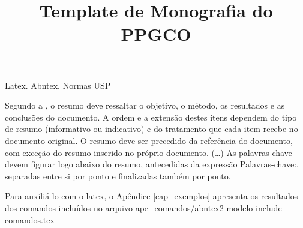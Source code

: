 \documentclass[tesedr]{ppgco}
\title{Template de Monografia do PPGCO}
\begin{document}
\renewcommand{\orientadorname}{Orientador: }
\renewcommand{\coorientadorname}{Coorientador: }
\renewcommand{\agradecimentosname}{Agradecimentos}

\pretextual

\maketitle






\begin{resumo}{Latex. Abntex. Normas USP}

 	 Segundo a , o resumo deve ressaltar o  objetivo, o método, os resultados e as conclusões do documento. A ordem e a extensão  destes itens dependem do tipo de resumo (informativo ou indicativo) e do  tratamento que cada item recebe no documento original. O resumo deve ser  precedido da referência do documento, com exceção do resumo inserido no  próprio documento. (\ldots) As palavras-chave devem figurar logo abaixo do  resumo, antecedidas da expressão Palavras-chave:, separadas entre si por  ponto e finalizadas também por ponto.
     
    Para auxiliá-lo com o latex, o Apêndice 
  \ref{cap_exemplos} apresenta os resultados dos comandos incluídos no arquivo ape\_comandos/abntex2-modelo-include-comandos.tex 

\end{resumo}
\end{document}
